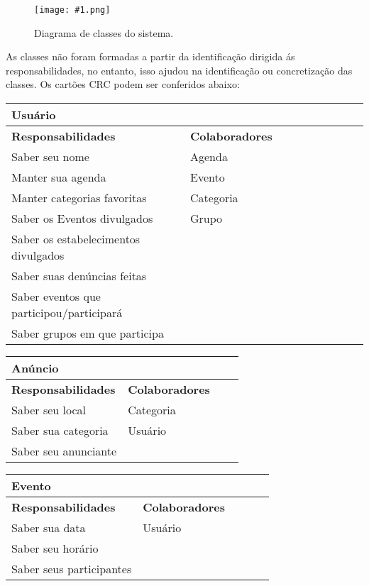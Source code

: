 \documentclass{article}
\newcommand{\diagrama}[2]
{
 \begin{figure}[H]
 \begin{center}
 \texttt{[image: \#1.png]}
 \end{center}
 \caption{#2}
 \label{fig:#1}
 \end{figure}
}
\begin{document}
\diagrama{Diagrama}{Diagrama de classes do sistema.} 

\pagebreak

As classes não foram formadas a partir da identificação dirigida ás responsabilidades, no entanto, isso ajudou na identificação ou concretização das classes. Os cartões CRC podem ser conferidos abaixo:

\begin{center}
 \begin{tabular}{|p{0.5\linewidth}|p{0.5\linewidth}|}
  \hline
  \multicolumn{2}{|p{\textwidth}|}{
   {\large \textbf{Usuário}}} \\
  \hline
  \textbf{Responsabilidades} & \textbf{Colaboradores} \\ 
  \hline
  Saber seu nome &  Agenda \\
  \hline
  Manter sua agenda & Evento \\
  \hline
  Manter categorias favoritas & Categoria \\
  \hline
  Saber os Eventos divulgados & Grupo  \\
  \hline
  Saber os estabelecimentos divulgados &  \\
  \hline
  Saber suas denúncias feitas &  \\
  \hline
  Saber eventos que participou/participará &  \\
  \hline
  Saber grupos em que participa & \\  
  \hline
 \end{tabular} 
\end{center}
    
    
    \begin{center}
   	 \begin{tabular}{|p{0.5\linewidth}|p{0.5\linewidth}|}
\hline
 	\multicolumn{2}{|p{\textwidth}|}{
{\large \textbf{Anúncio}}
}  \\
\hline
\textbf{Responsabilidades} & \textbf{Colaboradores} \\ 
\hline
  	Saber seu local & Categoria  \\
  	\hline
  	Saber sua categoria & Usuário \\
  	\hline
  	Saber seu anunciante &  \\
  	\hline
   	\end{tabular} 
    \end{center}
    
    
    \begin{center}
   	 \begin{tabular}{|p{0.5\linewidth}|p{0.5\linewidth}|}
\hline
 	\multicolumn{2}{|p{\textwidth}|}{
{\large \textbf{Evento}}
}  \\
\hline
\textbf{Responsabilidades} & \textbf{Colaboradores} \\ 
\hline
  	Saber sua data & Usuário \\
  	\hline
  	Saber seu horário &  \\
  	\hline
  	Saber seus participantes & \\
  	\hline
   	\end{tabular} 
    \end{center}
    
\end{document}
